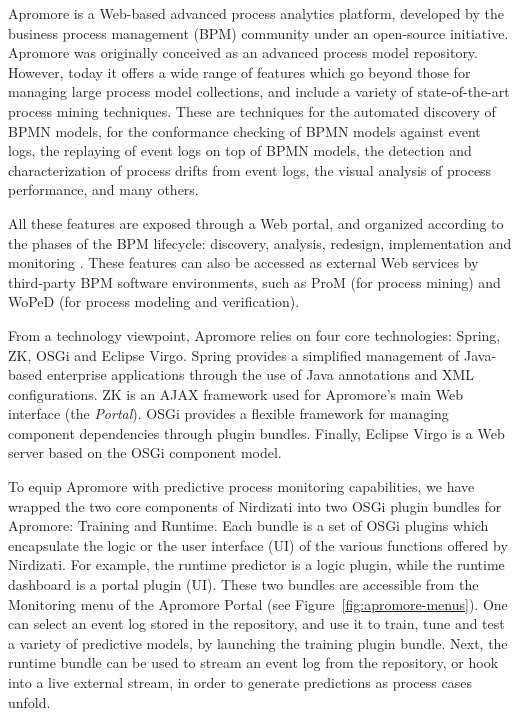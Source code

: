 Apromore is a Web-based advanced process analytics platform, developed by the business process management (BPM) community under an open-source initiative. Apromore was originally conceived as an advanced process model repository. However, today it offers a wide range of features which go beyond those for managing large process model collections, and include a variety of state-of-the-art process mining techniques. These are techniques for the automated discovery of BPMN models, for the conformance checking of BPMN models against event logs, the replaying of event logs on top of BPMN models, the detection and characterization of process drifts from event logs, the visual analysis of process performance, and many others. 

All these features are exposed through a Web portal, and organized according to the phases of the BPM lifecycle: discovery, analysis, redesign, implementation and monitoring \cite{Dumas2018}. These features can also be accessed as external Web services by third-party BPM software environments, such as ProM (for process mining) and WoPeD (for process modeling and verification).

From a technology viewpoint, Apromore relies on four core technologies: Spring, ZK, OSGi and Eclipse Virgo. Spring provides a simplified management of Java-based enterprise applications through the use of Java annotations and XML configurations. ZK is an AJAX framework used for Apromore's main Web interface (the \emph{Portal}). OSGi provides a flexible framework for managing component dependencies through plugin bundles. Finally, Eclipse Virgo is a Web server based on the OSGi component model.

To equip Apromore with predictive process monitoring capabilities, we have wrapped the two core components of Nirdizati into two OSGi plugin bundles for Apromore: Training and Runtime. Each bundle is a set of OSGi plugins which encapsulate the logic or the user interface (UI) of the various functions offered by Nirdizati. For example, the runtime predictor is a logic plugin, while the runtime dashboard is a portal plugin (UI). These two bundles are accessible from the Monitoring menu of the Apromore Portal (see Figure~\ref{fig:apromore-menus}). One can select an event log stored in the repository, and use it to train, tune and test a variety of predictive models, by launching the training plugin bundle. Next, the runtime bundle can be used to stream an event log from the repository, or hook into a live external stream, in order to generate predictions as process cases unfold.    

